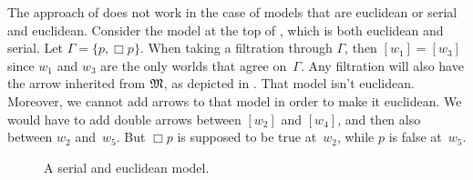 \documentclass[../../../include/open-logic-section]{subfiles}
\begin{document}


The approach of  does not work in the case of models
that are euclidean or serial and euclidean. Consider the model at the
top of , which is both euclidean and serial. Let
$\Gamma = \{p, \Box p \}$. When taking a filtration through $\Gamma$,
then $[w_1] = [w_3]$ since $w_1$ and $w_3$ are the only worlds that
agree on~$\Gamma$. Any filtration will also have the arrow inherited
from $\mModel{M}$, as depicted in . That model
isn't euclidean. Moreover, we cannot add arrows to that model in order
to make it euclidean. We would have to add double arrows between
$[w_2]$ and $[w_4]$, and then also between $w_2$ and~$w_5$. But $\Box
p$ is supposed to be true at~$w_2$, while $p$ is false at~$w_5$.

\begin{figure}[htpb]
  \centering
  \caption{A serial and euclidean model.}
\end{figure}
\end{document}
